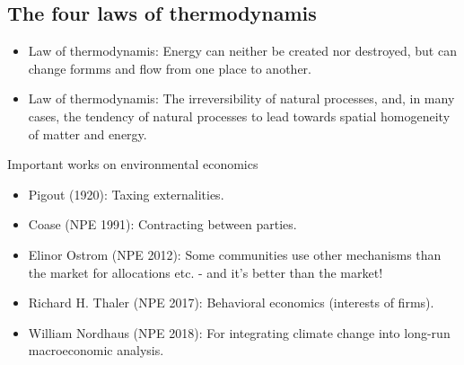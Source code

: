 \begin{multicols}{2}
\subsection{The four laws of thermodynamis}
\begin{itemize}
  \item[\nth{1}] Law of thermodynamis: Energy can neither be created nor destroyed, but can change formms and flow from one place to another.
  \item[\nth{2}] Law of thermodynamis: The irreversibility of natural processes, and, in many cases, the tendency of natural processes to lead towards spatial homogeneity of matter and energy.
\end{itemize}
\noindent
Important works on environmental economics
\begin{itemize}
  \item Pigout (1920): Taxing externalities.
  \item Coase (NPE 1991): Contracting between parties.
  \item Elinor Ostrom (NPE 2012): Some communities use other mechanisms than the market for allocations etc. - and it's better than the market!
  \item Richard H. Thaler (NPE 2017): Behavioral economics (interests of firms).
  \item William Nordhaus (NPE 2018): For integrating climate change into long-run macroeconomic analysis.
\end{itemize}

\end{multicols}
